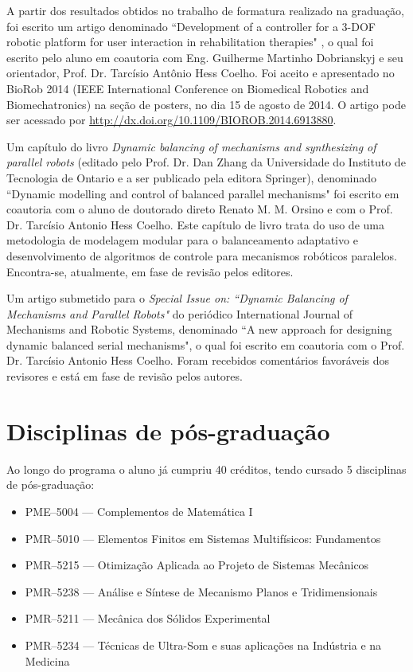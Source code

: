 \documentclass[a4paper,11pt,brazil,fleqn]{article}
\begin{document}
A partir dos resultados obtidos no trabalho de formatura realizado na gradua\c{c}\~ao, foi escrito um artigo denominado
``Development of a controller for a 3-DOF robotic platform for user interaction in rehabilitation therapies" \cite{Andre2}, o qual foi escrito pelo aluno em coautoria com Eng. Guilherme Martinho Dobrianskyj e seu orientador, Prof. Dr. Tarc\'isio Ant\^onio Hess Coelho. Foi aceito e apresentado no BioRob 2014 (IEEE International Conference on Biomedical Robotics and Biomechatronics) na se\c{c}\~ao de posters, no dia 15 de agosto de 2014. O artigo pode ser acessado por \url{http://dx.doi.org/10.1109/BIOROB.2014.6913880}.

Um cap\' itulo do livro {\em Dynamic balancing of mechanisms and synthesizing of parallel
robots}  (editado pelo Prof. Dr. Dan Zhang da Universidade do Instituto de Tecnologia
de Ontario e a ser publicado pela editora Springer), denominado ``Dynamic modelling
and control of balanced parallel mechanisms" foi escrito em coautoria com o aluno de
doutorado direto Renato M. M. Orsino e com o Prof. Dr. Tarc\'isio Antonio Hess Coelho.
Este cap\'itulo de livro trata do uso de uma metodologia de modelagem modular para o
balanceamento adaptativo e desenvolvimento de algoritmos de controle para mecanismos
rob\'oticos paralelos. Encontra-se, atualmente, em fase de revis\~ao pelos editores.

Um artigo submetido para o {\em  Special Issue on: ``Dynamic Balancing of Mechanisms and Parallel Robots" } do peri\'odico International Journal of Mechanisms and Robotic Systems, denominado ``A new approach for designing dynamic balanced serial mechanisms", o qual foi escrito em coautoria com o Prof. Dr. Tarc\'isio Antonio Hess Coelho. Foram recebidos coment\'arios favor\'aveis dos revisores e est\'a em fase de revis\~ao pelos autores.

\section{Disciplinas de p\'os-gradua\c{c}\~ao}\label{S06}

Ao longo do programa o aluno j\'a cumpriu 40 cr\'editos, tendo cursado 5 disciplinas 
de p\'os-gradua\c{c}\~ao:
\begin{itemize}
\item PME--5004 --- Complementos de Matem\'atica I
\item PMR--5010 --- Elementos Finitos em Sistemas Multif\'isicos: Fundamentos
\item PMR--5215 --- Otimiza\c{c}\~ao Aplicada ao Projeto de Sistemas Mec\^anicos
\item PMR--5238 --- An\'alise e S\'intese de Mecanismo Planos e Tridimensionais
\item PMR--5211 --- Mec\^anica dos S\'olidos Experimental
\item PMR--5234 --- T\'ecnicas de Ultra-Som e suas aplica\c{c}\~oes na Ind\'ustria e na Medicina
\end{itemize}
\end{document}

